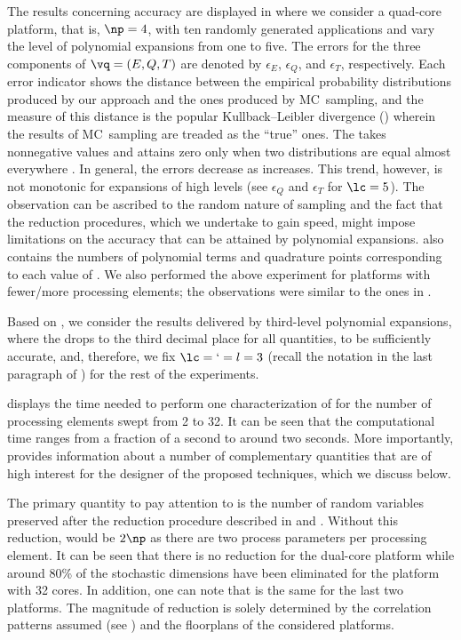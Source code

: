 The results concerning accuracy are displayed in  where we
consider a quad-core platform, that is, $\np = 4$, with ten randomly generated
applications and vary the level of polynomial expansions \lc from one to five.
The errors for the three components of $\vq = (E, Q, T)$ are denoted by
$\epsilon_E$, $\epsilon_Q$, and $\epsilon_T$, respectively. Each error indicator
shows the distance between the empirical probability distributions produced by
our approach and the ones produced by \ac{MC}\ sampling, and the measure of this
distance is the popular Kullback--Leibler divergence () wherein the
results of \ac{MC}\ sampling are treaded as the ``true'' ones. The 
takes nonnegative values and attains zero only when two distributions are equal
almost everywhere \cite{durrett2010}. In general, the errors decrease as \lc
increases. This trend, however, is not monotonic for expansions of high levels
(see $\epsilon_Q$ and $\epsilon_T$ for $\lc = 5$). The observation can be
ascribed to the random nature of sampling and the fact that the reduction
procedures, which we undertake to gain speed, might impose limitations on the
accuracy that can be attained by polynomial expansions.  also
contains the numbers of polynomial terms \nc and quadrature points \nq
corresponding to each value of \lc. We also performed the above experiment for
platforms with fewer/more processing elements; the observations were similar to
the ones in .

Based on , we consider the results delivered by third-level
polynomial expansions, where the  drops to the third decimal place for
all quantities, to be sufficiently accurate, and, therefore, we fix $\lc = \lq =
l = 3$ (recall the notation in the last paragraph of
) for the rest of the experiments.

 displays the time needed to perform one characterization of \vq for
the number of processing elements \np swept from 2 to 32. It can be seen that
the computational time ranges from a fraction of a second to around two seconds.
More importantly,  provides information about a number of
complementary quantities that are of high interest for the designer of the
proposed techniques, which we discuss below.

The primary quantity to pay attention to is the number of random variables \nz
preserved after the reduction procedure described in  and
. Without this reduction, \nz would be $2 \np$ as
there are two process parameters per processing element. It can be seen that
there is no reduction for the dual-core platform while around 80\% of the
stochastic dimensions have been eliminated for the platform with 32 cores. In
addition, one can note that \nz is the same for the last two platforms. The
magnitude of reduction is solely determined by the correlation patterns assumed
(see ) and the floorplans of the considered platforms.


